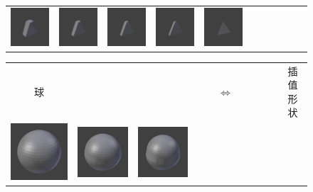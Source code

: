 \documentclass[bachelor, nocolorlinks, printoneside]{seuthesis} %
\begin{document}
\begin{Main}
\begin{figure}
\begin{tabular}{c@{}c@{}c@{}c@{}c@{}c@{}c@{}c@{}c@{}c@{}c@{}}
		\includegraphics[width=.09\textwidth,keepaspectratio]{figs/triangle/cube_triangle/Isometric_6.png} &
		\includegraphics[width=.09\textwidth,keepaspectratio]{figs/triangle/cube_triangle/Isometric_7.png} &
		\includegraphics[width=.09\textwidth,keepaspectratio]{figs/triangle/cube_triangle/Isometric_8.png} &
		\includegraphics[width=.09\textwidth,keepaspectratio]{figs/triangle/cube_triangle/Isometric_9.png} &
		\includegraphics[width=.09\textwidth,keepaspectratio]{figs/triangle/cube_triangle/Isometric_10.png} \\    	
    \end{tabular}
    \begin{tabular}{c@{}c@{}c@{}c@{}c@{}c@{}c@{}c@{}c@{}c@{}c@{}}
	    球   & & & & & $\Longleftrightarrow$ & & & & & 插值形状 \\
		\includegraphics[width=.09\textwidth,keepaspectratio]{figs/triangle/sphere_triangle/Isometric0.png} &
		\includegraphics[width=.09\textwidth,keepaspectratio]{figs/triangle/sphere_triangle/Isometric1.png} &
		\includegraphics[width=.09\textwidth,keepaspectratio]{figs/triangle/sphere_triangle/Isometric2.png} &

\end{tabular}
\end{figure}
\end{Main}
\end{document}
